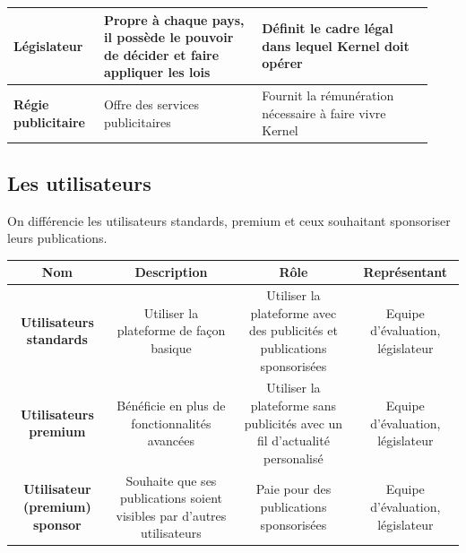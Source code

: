 \documentclass[11pt]{article}
\begin{document}
\begin{center}
\begin{tabular}{|L{0.2\linewidth}|L{0.35\linewidth}|L{0.38\linewidth}|}
		\hline
		\textbf{Législateur} & Propre à chaque pays, il possède le pouvoir de décider et faire appliquer les lois & Définit le cadre légal dans lequel Kernel doit opérer \\
		\hline
		\textbf{Régie publicitaire} & Offre des services publicitaires & Fournit la rémunération nécessaire à faire vivre Kernel \\
		\hline
	\end{tabular}
\end{center}

\subsection{Les utilisateurs}


On différencie les utilisateurs standards, premium et ceux souhaitant sponsoriser leurs publications.

\begin{center}
	\begin{tabular}{|C{0.18\hsize}|C{0.22\hsize}|C{0.25\hsize}|C{0.20\hsize}|}
		\hline
		\textbf{Nom} & \textbf{Description} & \textbf{Rôle} & \textbf{Représentant} \\
		\hline
		\textbf{Utilisateurs standards} & Utiliser la plateforme de façon basique & Utiliser la plateforme avec des publicités et publications sponsorisées & Equipe d’évaluation, législateur \\
		\hline
		\textbf{Utilisateurs premium} & Bénéficie en plus de fonctionnalités avancées & Utiliser la plateforme sans publicités avec un fil d’actualité personalisé & Equipe d’évaluation, législateur \\
		\hline
		\textbf{Utilisateur (premium) sponsor} & Souhaite que ses publications soient visibles par d'autres utilisateurs & Paie pour des publications sponsorisées & Equipe d'évaluation, législateur \\
		\hline
	\end{tabular}
\end{center}
\end{document}
